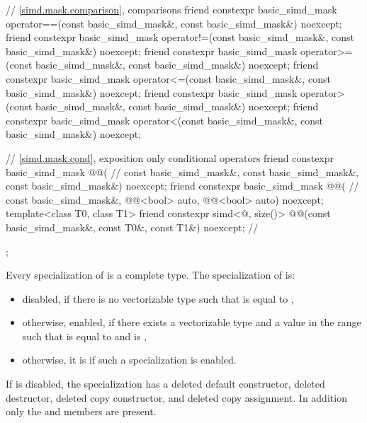 \begin{codeblock}
{{    // \ref{simd.mask.comparison},  comparisons
    friend constexpr basic_simd_mask
      operator==(const basic_simd_mask&, const basic_simd_mask&) noexcept;
    friend constexpr basic_simd_mask
      operator!=(const basic_simd_mask&, const basic_simd_mask&) noexcept;
    friend constexpr basic_simd_mask
      operator>=(const basic_simd_mask&, const basic_simd_mask&) noexcept;
    friend constexpr basic_simd_mask
      operator<=(const basic_simd_mask&, const basic_simd_mask&) noexcept;
    friend constexpr basic_simd_mask
      operator>(const basic_simd_mask&, const basic_simd_mask&) noexcept;
    friend constexpr basic_simd_mask
      operator<(const basic_simd_mask&, const basic_simd_mask&) noexcept;

    // \ref{simd.mask.cond},  exposition only conditional operators
    friend constexpr basic_simd_mask @@( // \expos
      const basic_simd_mask&, const basic_simd_mask&, const basic_simd_mask&) noexcept;
    friend constexpr basic_simd_mask @@( // \expos
      const basic_simd_mask&, @@<bool> auto, @@<bool> auto) noexcept;
    template<class T0, class T1>
      friend constexpr simd<@\seebelow@, size()>
        @@(const basic_simd_mask&, const T0&, const T1&) noexcept; // \expos
  };
}
\end{codeblock}

\pnum
Every specialization of  is a complete type.
The specialization of  is:
\begin{itemize}
 \item
   disabled, if there is no vectorizable type  such that 
   is equal to ,
 \item
   otherwise, enabled, if there exists a vectorizable type  and a
   value  in the range  such that  is equal
   to  and  is ,
 \item
   otherwise, it is  if such a specialization is enabled.
\end{itemize}

If  is disabled, the specialization has a
deleted default constructor, deleted destructor, deleted copy constructor, and
deleted copy assignment.
In addition only the  and  members are
present.

